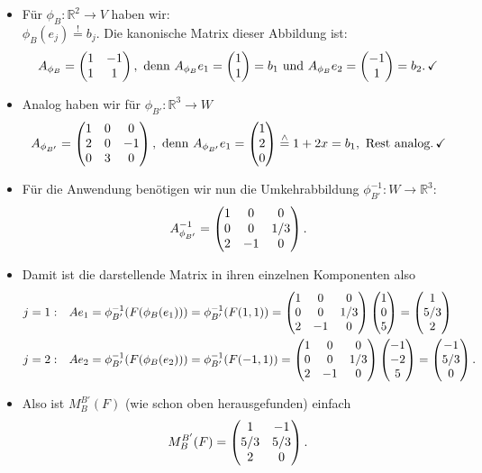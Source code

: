 \begin{itemize}
    \item Für $\phi_B:\mathbb{R}^2\to V$ haben wir:\\
    $\phi_B(e_j)\overset{!}{=}b_j$. Die kanonische Matrix dieser Abbildung ist:
    \begin{equation*}
        A_{\phi_B}=\begin{pmatrix}1&-1\\1&1\end{pmatrix},\text{ denn } A_{\phi_B}e_1=\begin{pmatrix}1\\1\end{pmatrix}=b_1\text{ und } A_{\phi_B}e_2=\begin{pmatrix}-1\\1\end{pmatrix}=b_2.\,\checkmark
    \end{equation*}
    \item Analog haben wir für $\phi_{B'}:\mathbb{R}^3\to W$
    \begin{equation*}
        A_{\phi_{B'}}=\begin{pmatrix}1&0&0\\2&0&-1\\0&3&0\end{pmatrix}, \text{ denn } A_{\phi_{B'}}e_1=\begin{pmatrix}1\\2\\0\end{pmatrix}\overset{\wedge}{=}1+2x=b_1,\text{ Rest analog}.\,\checkmark
    \end{equation*}
    \item Für die Anwendung benötigen wir nun die Umkehrabbildung $\phi_{B'}^{-1}:W\to\mathbb{R}^3$:
    \begin{equation*}
        A_{\phi_{B'}}^{-1}=\begin{pmatrix}1&0&0\\0&0&1/3\\2&-1&0\end{pmatrix}.
    \end{equation*}
    \item Damit ist die darstellende Matrix in ihren einzelnen Komponenten also
    \begin{align*}
        j=1:&\quad A e_1=\phi_{B'}^{-1}(F(\phi_B(e_1)))=\phi_{B'}^{-1}(F(1,1))=\begin{pmatrix}1&0&0\\0&0&1/3\\2&-1&0\end{pmatrix}\begin{pmatrix}1\\0\\5\end{pmatrix}=\begin{pmatrix}1\\5/3\\2\end{pmatrix}\\
        j=2:&\quad A e_2=\phi_{B'}^{-1}(F(\phi_B(e_2)))=\phi_{B'}^{-1}(F(-1,1))=\begin{pmatrix}1&0&0\\0&0&1/3\\2&-1&0\end{pmatrix}\begin{pmatrix}-1\\-2\\5\end{pmatrix}=\begin{pmatrix}-1\\5/3\\0\end{pmatrix}.
    \end{align*}
    \item Also ist $M_B^{B'}(F)$ (wie schon oben herausgefunden) einfach
    \begin{equation*}
        M_B^{B'}(F)=\begin{pmatrix}1&-1\\5/3&5/3\\2&0\end{pmatrix}.
    \end{equation*}
\end{itemize}


